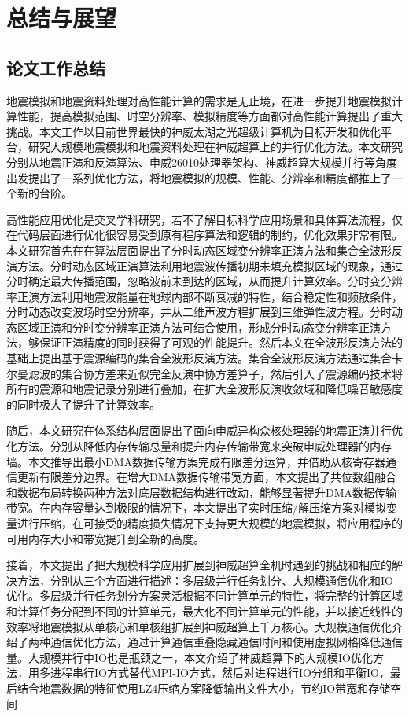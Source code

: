 \chapter{总结与展望} %
\label{ch:总结与展望}

\section{论文工作总结}

地震模拟和地震资料处理对高性能计算的需求是无止境，在进一步提升地震模拟计算性能，提高模拟范围、时空分辨率、模拟精度等方面都对高性能计算提出了重大挑战。本文工作以目前世界最快的神威太湖之光超级计算机为目标开发和优化平台，研究大规模地震模拟和地震资料处理在神威超算上的并行优化方法。本文研究分别从地震正演和反演算法、申威26010处理器架构、神威超算大规模并行等角度出发提出了一系列优化方法，将地震模拟的规模、性能、分辨率和精度都推上了一个新的台阶。

高性能应用优化是交叉学科研究，若不了解目标科学应用场景和具体算法流程，仅在代码层面进行优化很容易受到原有程序算法和逻辑的制约，优化效果非常有限。本文研究首先在在算法层面提出了分时动态区域变分辨率正演方法和集合全波形反演方法。分时动态区域正演算法利用地震波传播初期未填充模拟区域的现象，通过分时确定最大传播范围，忽略波前未到达的区域，从而提升计算效率。分时变分辨率正演方法利用地震波能量在地球内部不断衰减的特性，结合稳定性和频散条件，分时动态改变波场时空分辨率，并从二维声波方程扩展到三维弹性波方程。分时动态区域正演和分时变分辨率正演方法可结合使用，形成分时动态变分辨率正演方法，够保证正演精度的同时获得了可观的性能提升。然后本文在全波形反演方法的基础上提出基于震源编码的集合全波形反演方法。集合全波形反演方法通过集合卡尔曼滤波的集合协方差来近似完全反演中协方差算子，然后引入了震源编码技术将所有的震源和地震记录分别进行叠加，在扩大全波形反演收敛域和降低噪音敏感度的同时极大了提升了计算效率。

随后，本文研究在体系结构层面提出了面向申威异构众核处理器的地震正演并行优化方法。分别从降低内存传输总量和提升内存传输带宽来突破申威处理器的内存墙。本文推导出最小DMA数据传输方案完成有限差分运算，并借助从核寄存器通信更新有限差分边界。在增大DMA数据传输带宽方面，本文提出了共位数组融合和数据布局转换两种方法对底层数据结构进行改动，能够显著提升DMA数据传输带宽。在内存容量达到极限的情况下，本文提出了实时压缩/解压缩方案对模拟变量进行压缩，在可接受的精度损失情况下支持更大规模的地震模拟，将应用程序的可用内存大小和带宽提升到全新的高度。

接着，本文提出了把大规模科学应用扩展到神威超算全机时遇到的挑战和相应的解决方法，分别从三个方面进行描述：多层级并行任务划分、大规模通信优化和IO优化。多层级并行任务划分方案灵活根据不同计算单元的特性，将完整的计算区域和计算任务分配到不同的计算单元，最大化不同计算单元的性能，并以接近线性的效率将地震模拟从单核心和单核组扩展到神威超算上千万核心。大规模通信优化介绍了两种通信优化方法，通过计算通信重叠隐藏通信时间和使用虚拟网格降低通信量。大规模并行中IO也是瓶颈之一，本文介绍了神威超算下的大规模IO优化方法，用多进程串行IO方式替代MPI-IO方式，然后对进程进行IO分组和平衡IO，最后结合地震数据的特征使用LZ4压缩方案降低输出文件大小，节约IO带宽和存储空间

